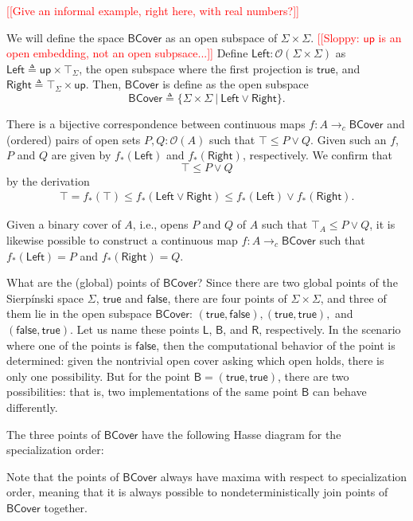 \documentclass[conference]{IEEEtran}
\newcommand{\cto}{\to_c}
\newcommand{\suchthat}{\ |\ }
\newcommand{\Open}[1]{\mathcal{O}({#1})}
\newcommand{\note}[1]{\textcolor{red}{[[{#1}]]}}
\newcommand{\up}{\mathsf{up}}
\begin{document}
\note{Give an informal example, right here, with real numbers?}

We will define the space $\mathsf{BCover}$ as an open subspace of $\Sigma \times \Sigma$. \note{Sloppy: $\mathsf{up}$ is an open embedding, not an open subpsace...} Define $\mathsf{Left} : \Open{\Sigma \times \Sigma}$ as $\mathsf{Left} \triangleq \up \times \top_\Sigma$, the open subspace where the first projection is $\mathsf{true}$, and $\mathsf{Right} \triangleq \top_\Sigma \times \up$. Then, $\mathsf{BCover}$ is define as the open subspace
\[
\mathsf{BCover} \triangleq \{ \Sigma \times \Sigma \suchthat \mathsf{Left} \vee \mathsf{Right} \}.
\]

There is a bijective correspondence between continuous maps $f : A \cto \mathsf{BCover}$ and (ordered) pairs of open sets $P, Q : \Open{A}$ such that $\top \le P \vee Q$. Given such an $f$, $P$ and $Q$ are given by $f_*(\mathsf{Left})$ and $f_*(\mathsf{Right})$, respectively. We confirm that
\[
\top \le P \vee Q
\]
by the derivation
\begin{align*}
\top = f_*(\top) 
  \le f_*(\mathsf{Left} \vee \mathsf{Right})
  \le f_*(\mathsf{Left}) \vee f_*(\mathsf{Right}).
\end{align*}

Given a binary cover of $A$, i.e., opens $P$ and $Q$ of $A$ such that $\top_A \le P \vee Q$, it is likewise possible to construct a continuous map $f: A \cto \mathsf{BCover}$ such that $f_*(\mathsf{Left}) = P$ and $f_*(\mathsf{Right}) = Q$.

What are the (global) points of $\mathsf{BCover}$? Since there are two global points of the Sierp\'inski space $\Sigma$, $\mathsf{true}$ and $\mathsf{false}$, there are four points of $\Sigma \times \Sigma$, and three of them lie in the open subspace $\mathsf{BCover}$: $(\mathsf{true}, \mathsf{false}), (\mathsf{true}, \mathsf{true}),$ and $(\mathsf{false}, \mathsf{true})$. Let us name these points $\mathsf{L}$, $\mathsf{B}$, and $\mathsf{R}$, respectively. In the scenario where one of the points is $\mathsf{false}$, then the computational behavior of the point is determined: given the nontrivial open cover asking which open holds, there is only one possibility. But for the point $\mathsf{B} = (\mathsf{true}, \mathsf{true})$, there are two possibilities: that is, two implementations of the same point $\mathsf{B}$ can behave differently.

The three points of $\mathsf{BCover}$ have the following Hasse diagram for the specialization order:
\begin{center}
\end{center}
Note that the points of $\mathsf{BCover}$ always have maxima with respect to specialization order, meaning that it is always possible to nondeterministically join points of $\mathsf{BCover}$ together.
\end{document}
